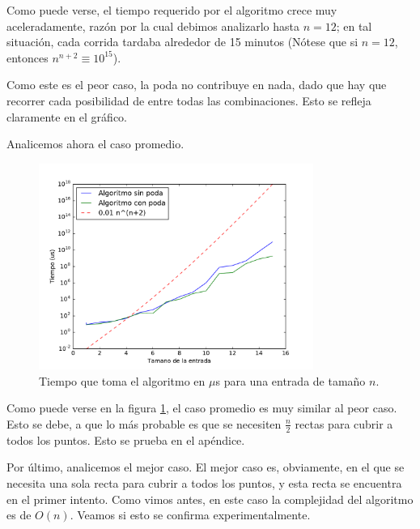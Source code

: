Como puede verse, el tiempo requerido por el algoritmo crece muy aceleradamente, razón por la cual debimos analizarlo hasta $n = 12$; en tal situación, cada corrida tardaba alrededor de 15 minutos (Nótese que si $n = 12$, entonces $n^{n+2} \equiv 10^{15}$).

Como este es el peor caso, la poda no contribuye en nada, dado que hay que recorrer cada posibilidad de entre todas las combinaciones. Esto se refleja claramente en el gráfico.

Analicemos ahora el caso promedio.

\begin{figure}[H]
 \centering
	\includegraphics[width=0.8\textwidth]{img/tiempos/kamehameha2.pdf}
	\caption{\footnotesize Tiempo que toma el algoritmo en $\mu$s para una entrada de tamaño $n$.}
	\label{fig:kamehameha-tiempos2}
\end{figure}

Como puede verse en la figura \ref{fig:kamehameha-tiempos2}, el caso promedio es muy similar al peor caso. Esto se debe, a que lo más probable es que se necesiten $\frac{n}{2}$ rectas para cubrir a todos los puntos. Esto se prueba en el ap\'endice.

Por último, analicemos el mejor caso. El mejor caso es, obviamente, en el que se necesita una sola recta para cubrir a todos los puntos, y esta recta se encuentra en el primer intento. Como vimos antes, en este caso la complejidad del algoritmo es de $O(n)$. Veamos si esto se confirma experimentalmente.

